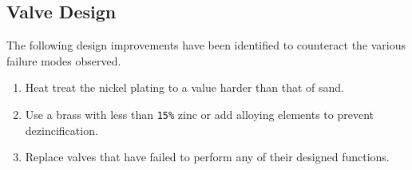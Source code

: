 \documentclass[]{article}
\begin{document}
\subsection{Valve Design}
The following design improvements have been identified to counteract the various failure modes observed.
\begin{enumerate}
	\item Heat treat the nickel plating to a value harder than that of sand.
	\item Use a brass with less than \verb|15%| zinc or add alloying elements to prevent dezincification. 
	\item Replace valves that have failed to perform any of their designed functions.
\end{enumerate}



\end{document}
